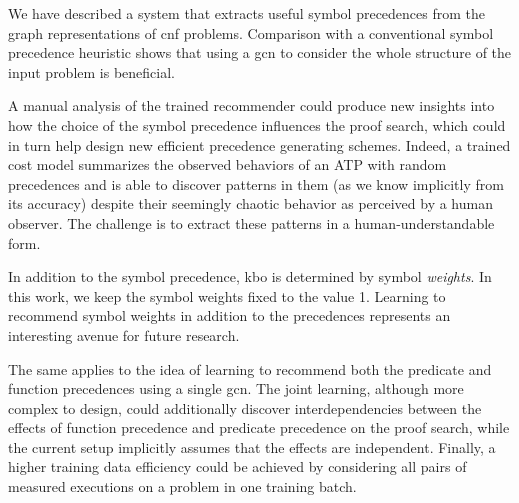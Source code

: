 
We have described a system that extracts useful symbol precedences from the graph representations of \gls{cnf} problems.
Comparison with a conventional symbol precedence heuristic shows that using a \gls{gcn}
to consider the whole structure of the input problem is beneficial.

A manual analysis of the trained recommender could produce new insights into how the choice of the symbol precedence influences the proof search,
which could in turn help design new efficient precedence generating schemes.
Indeed, a trained cost model summarizes the observed behaviors of an ATP with random precedences
and is able to discover patterns in them (as we know implicitly from its accuracy) 
despite their seemingly chaotic behavior as perceived by a human observer.
The challenge is to extract these patterns in a human-understandable form.

In addition to the symbol precedence,
\gls{kbo} is determined by symbol \emph{weights}.
In this work, we keep the symbol weights fixed to the value 1.
Learning to recommend symbol weights in addition to the precedences
represents an interesting avenue for future research.

The same applies to the idea of learning to recommend 
both the predicate and function precedences using a single \gls{gcn}.
The joint learning, although more complex to design, could 
additionally discover interdependencies
between the effects of function precedence and predicate precedence on the proof search,
while the current setup implicitly assumes that the effects are independent.
Finally, a higher training data efficiency could be achieved by considering all pairs of measured executions on a problem
in one training batch.


